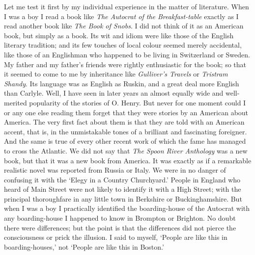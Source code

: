 \documentclass{book}
\begin{document}
Let me test it first by my individual experience in the matter of literature. When I was a boy I read a book like \emph{The Autocrat of the Breakfast-table} exactly as I read another book like \emph{The Book of Snobs}. I did not think of it as an American book, but simply as a book. Its wit and idiom were like those of the English literary tradition; and its few touches of local colour seemed merely accidental, like those of an Englishman who happened to be living in Switzerland or Sweden. My father and my father’s friends were rightly enthusiastic for the book; so that it seemed to come to me by inheritance like \emph{Gulliver’s Travels} or \emph{Tristram Shandy}. Its language was as English as Ruskin, and a great deal more English than Carlyle. Well, I have seen in later years an almost equally wide and well-merited popularity of the stories of O. Henry. But never for one moment could I or any one else reading them forget that they were stories by an American about America. The very first fact about them is that they are told with an American accent, that is, in the unmistakable tones of a brilliant and fascinating foreigner. And the same is true of every other recent work of which the fame has managed to cross the Atlantic. We did not say that \emph{The Spoon River Anthology} was a new book, but that it was a new book from America. It was exactly as if a remarkable realistic novel was reported from Russia or Italy. We were in no danger of confusing it with the ‘Elegy in a Country Churchyard.’ People in England who heard of Main Street were not likely to identify it with a High Street; with the principal thoroughfare in any little town in Berkshire or Buckinghamshire. But when I was a boy I practically identified the boarding-house of the Autocrat with any boarding-house I happened to know in Brompton or Brighton. No doubt there were differences; but the point is that the differences did not pierce the consciousness or prick the illusion. I said to myself, ‘People are like this in boarding-houses,’ not ‘People are like this in Boston.’
\end{document}
